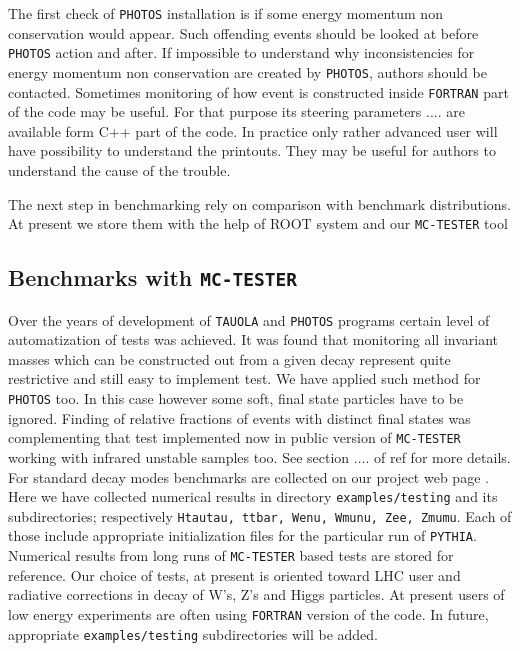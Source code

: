 \documentclass[]{Photos_interface_design}
\begin{document}
The first check of {\tt PHOTOS} installation is if some energy momentum non 
conservation would appear. Such offending events should be looked at
before {\tt PHOTOS} action and after.
If impossible to understand why inconsistencies for energy momentum non 
conservation are created by {\tt PHOTOS}, authors should be contacted. Sometimes
monitoring of how event is constructed inside {\tt FORTRAN} part of the code
may be useful. For that purpose its steering parameters .... are
available form C++ part of the code. In practice only rather
 advanced user will have possibility to understand the printouts. They may be 
useful for authors to understand the cause of the trouble.

The next step in benchmarking rely on comparison with benchmark distributions. 
At present we store them with the help of ROOT system and our {\tt MC-TESTER} tool



\subsection{Benchmarks with {\tt MC-TESTER}}
Over the years of development of {\tt TAUOLA} and {\tt PHOTOS} programs certain level 
of automatization of tests was achieved. It was found that monitoring all invariant masses which can be constructed out from a given decay represent 
quite restrictive and still easy to implement test. We have applied such method 
for {\tt PHOTOS} too. In this case however some soft, final state particles have to be ignored. Finding of relative fractions of events with distinct final states 
was complementing that test implemented now in public version of {\tt MC-TESTER}
working with infrared unstable samples too. See section .... of 
ref \cite{Davidson:2008ma} for more details. For standard decay modes benchmarks are collected on our project web page \cite{Photos_tests}.
Here we have collected numerical results in directory 
{\tt examples/testing} and its subdirectories; respectively  
{\tt Htautau, ttbar, Wenu, Wmunu, Zee, Zmumu}. Each of those include
appropriate initialization files for the particular run of {\tt PYTHIA}. Numerical results from long runs of {\tt MC-TESTER} based tests
are stored for reference. Our choice of tests, at present is oriented toward 
LHC user and radiative corrections in decay of W's, Z's and Higgs particles.
At present users of low energy experiments are often using {\tt FORTRAN} version 
of the code. In future, appropriate   {\tt examples/testing} subdirectories will
be added.
\end{document}
